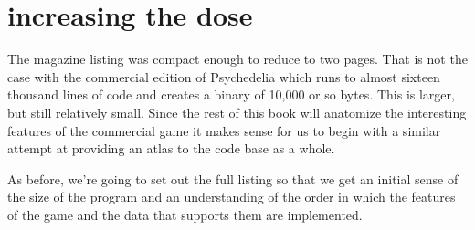\chapter{increasing the dose} 
\label{sec:fullgame}
\rhead[]{\leftmark}
\lstset{style=6502Style}
\lstset{ 
   aboveskip=5pt,
   belowskip=0pt,
}

The magazine listing was compact enough to reduce to two pages. That is not the case
with the commercial edition of Psychedelia which runs to almost sixteen thousand lines of
code and creates a binary of 10,000 or so bytes. This is larger, but still relatively small. Since the rest of this book will 
anatomize the interesting features of the commercial game it makes sense for us to
begin with a similar attempt at providing an atlas to the code base as a whole.

As before, we're going to set out the full listing so that we get an initial sense of the
size of the program and an understanding of the order in which the features of the game
and the data that supports them are implemented.


\clearpage
